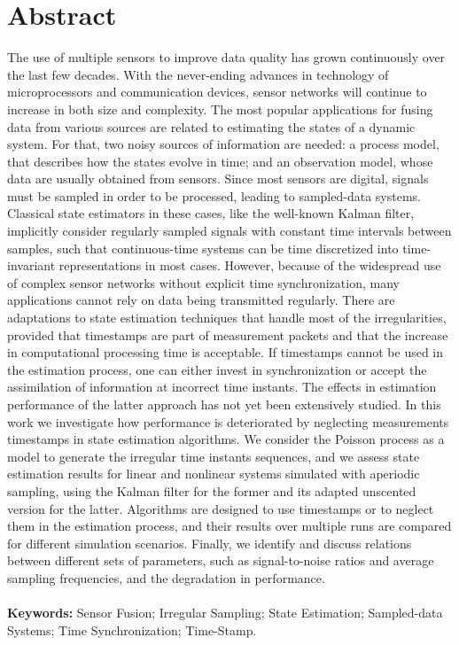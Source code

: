 \chapter*{Abstract}

\vspace{-2cm} 
The use of multiple sensors to improve data quality has grown continuously over the last few decades. With the never-ending advances in technology of microprocessors and communication devices, sensor networks will continue to increase in both size and complexity. The most popular applications for fusing data from various sources are related to estimating the states of a dynamic system. For that, two noisy sources of information are needed: a process model, that describes how the states evolve in time; and an observation model, whose data are usually obtained from sensors. Since most sensors are digital, signals must be sampled in order to be processed, leading to sampled-data systems. Classical state estimators in these cases, like the well-known Kalman filter, implicitly consider regularly sampled signals with constant time intervals between samples, such that continuous-time systems can be time discretized into time-invariant representations in most cases. However, because of the widespread use of complex sensor networks without explicit time synchronization, many applications cannot rely on data being transmitted regularly. There are adaptations to state estimation techniques that handle most of the irregularities, provided that timestamps are part of measurement packets and that the increase in computational processing time is acceptable. If timestamps cannot be used in the estimation process, one can either invest in synchronization or accept the assimilation of information at incorrect time instants. The effects in estimation performance of the latter approach has not yet been extensively studied. In this work we investigate how performance is deteriorated by neglecting measurements timestamps in state estimation algorithms. We consider the Poisson process as a model to generate the irregular time instants sequences, and we assess state estimation results for linear and nonlinear systems simulated with aperiodic sampling, using the Kalman filter for the former and its adapted unscented version for the latter. Algorithms are designed to use timestamps or to neglect them in the estimation process, and their results over multiple runs are compared for different simulation scenarios. Finally, we identify and discuss relations between different sets of parameters, such as signal-to-noise ratios and average sampling frequencies, and the degradation in performance.
\\ \\
\textbf{Keywords:} Sensor Fusion; Irregular Sampling; State Estimation; Sampled-data Systems; Time Synchronization; Time-Stamp.

